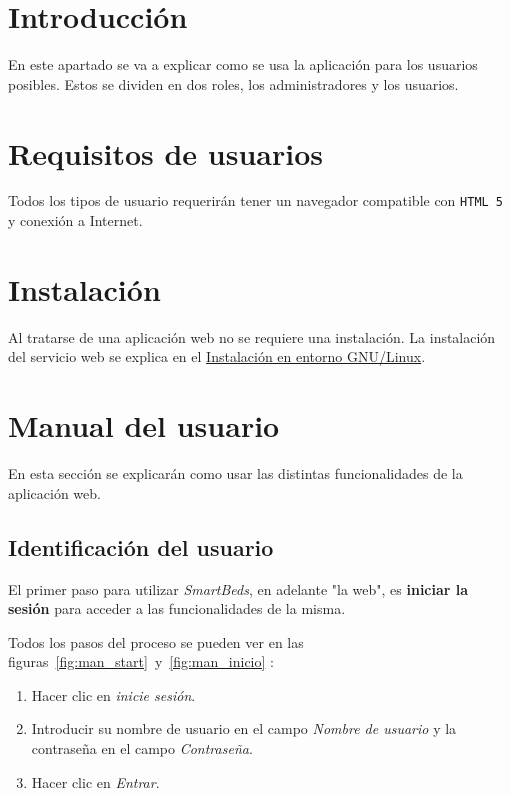 
\section{Introducción}

En este apartado se va a explicar como se usa la aplicación para los usuarios posibles. Estos se dividen en dos roles, los administradores y los usuarios.

\section{Requisitos de usuarios}

Todos los tipos de usuario requerirán tener un navegador compatible con \texttt{HTML 5} y conexión a Internet.

\section{Instalación}

Al tratarse de una aplicación web no se requiere una instalación. La instalación del servicio web se explica en el \hyperref[sec:instalacion]{Instalación en entorno GNU/Linux}.

\section{Manual del usuario}

En esta sección se explicarán como usar las distintas funcionalidades de la aplicación web.

\subsection{Identificación del usuario}

El primer paso para utilizar \textit{SmartBeds}, en adelante "la web", es \textbf{iniciar la sesión} para acceder a las funcionalidades de la misma. 

Todos los pasos del proceso se pueden ver en las figuras~\ref{fig:man_start}~y~\ref{fig:man_inicio} :
\begin{enumerate}
	\item Hacer clic en \textit{inicie sesión}.
	\item Introducir su nombre de usuario en el campo \textit{Nombre de usuario} y la contraseña en el campo \textit{Contraseña}.
	\item Hacer clic en \textit{Entrar}.
\end{enumerate} 

